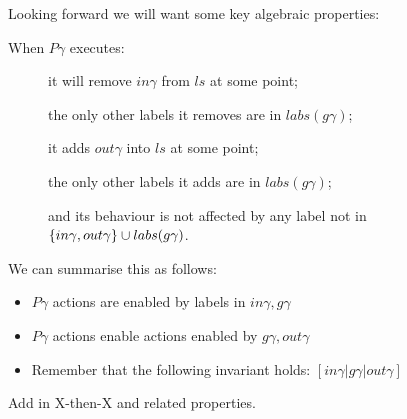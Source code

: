 Looking forward we will want some key algebraic properties:


When $P\gamma$ executes:
\begin{description}
  \item[]
    it will remove $in\gamma$ from $ls$ at some point;
  \item[]
    the only other labels it removes are in $labs(g\gamma)$;
  \item[]
    it adds $out\gamma$ into $ls$ at some point;
  \item[]
    the only other labels it adds are in $labs(g\gamma)$;
  \item[]
    and its behaviour is not affected by any label not
    in
    \\$\{in\gamma,out\gamma\} \cup labs(g\gamma)$.
\end{description}
We can summarise this as follows:
\begin{itemize}
  \item $P\gamma$ actions are enabled by labels in $in\gamma,g\gamma$
  \item $P\gamma$ actions enable actions enabled by $g\gamma,out\gamma$
  \item Remember that the following invariant holds: $[in\gamma|g\gamma|out\gamma]$
\end{itemize}





Add in X-then-X and related properties.

